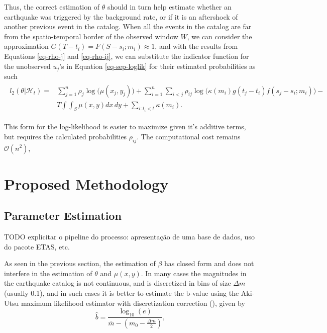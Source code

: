 Thus, the correct estimation of $\theta$ should in turn help estimate whether an earthquake was triggered by the background rate, or if it is an aftershock of another previous event in the catalog. When all the events in the catalog are far from the spatio-temporal border of the observed window $W$, we can consider the approximation $G(T - t_{i}) = F(S - s_{i};m_{i}) \approx 1$, and with the results from Equations \eqref{eq-rho-j} and \eqref{eq-rho-ij}, we can substitute the indicator function for the unobserved $u_{j}$'s in Equation \eqref{eq-sep-loglik} for their estimated probabilities as such
\begin{align}
  \begin{split}
    \label{eq-loglik-simp}
    l_{2}(\theta|\mathcal{H}_{t}) = &\sum_{j = 1}^{n}\rho_{j}\log\Big(\mu(x_{j},y_{j})\Big) + \sum_{i=1}^{n}\sum_{i < j}\rho_{ij}\log\Big(\kappa(m_{i})g(t_{j} - t_{i})f(s_{j} - s_{i};m_{i})\Big) - \\
                                    &T\int\int_{S}\mu(x,y)dx\, dy + \sum_{i:t_{i} < t}\kappa(m_{i}).
  \end{split}
\end{align}

This form for the log-likelihood is easier to maximize given it's additive terms, but requires the calculated probabilities $\rho_{ij}$. The computational cost remains $\mathcal{O}(n^{2})$,

\part{Proposed Methodology}

\chapter{Parameter Estimation}
\label{chap-param-estim}

TODO explicitar o pipeline do processo: apresentação de uma base de dados, uso do pacote ETAS, etc.

As seen in the previous section, the estimation of $\beta$ has closed form and does not interfere in the estimation of $\theta$ and $\mu(x,y)$. In many cases the magnitudes in the earthquake catalog is not continuous, and is discretized in bins of size $\Delta m$ (usually 0.1), and in such cases it is better to estimate the b-value using the Aki-Utsu maximum likelihood estimator with discretization correction (), given by
\begin{equation}
  \label{eq-b-hat}
  \hat{b} = \frac{\log_{10}(e)}{\bar{m} - \left(m_{0} - \frac{\Delta m}{2}\right)},
\end{equation}

